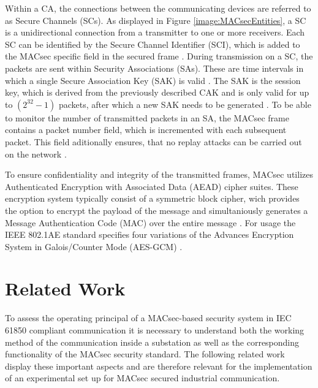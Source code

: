 \documentclass[conference, onecolumn, a4paper]{IEEEtran}
\begin{document}
\smallskip
Within a CA, the connections between the communicating devices are referred to as Secure Channels (SCs). As displayed in Figure \ref{image:MACsecEntities}, 
a SC is a unidirectional connection from a transmitter to one or more receivers. Each SC can be identified by the Secure Channel Identifier (SCI), 
which is added to the MACsec specific field in the secured frame \cite[p. 43]{IEEE-802-1AE:2018}. During transmission on a SC, the packets are sent 
within Security Associations (SAs). These are time intervals in which a single Secure Association Key (SAK) is valid \cite[p. 44]{IEEE-802-1AE:2018}. 
The SAK is the session key, which is derived from the previously described CAK and is only valid for up to ${(2^{32} -1)}$ packets, after which a new 
SAK needs to be generated \cite[p. 66]{IEEE-802-1AE:2018}. To be able to monitor the number of transmitted packets in an SA, the MACsec frame contains 
a packet number field, which is incremented with each subsequent packet. This field aditionally ensures, that no replay attacks can be carried out on 
the network \cite[p. 145]{IEEE-802-1AE:2018}. 

\smallskip
To ensure confidentiality and integrity of the transmitted frames, MACsec utilizes Authenticated Encryption with Associated Data (AEAD) cipher suites. 
These encryption system typically consist of a symmetric block cipher, wich provides the option to encrypt the payload of the message and simultaniously 
generates a Message Authentication Code (MAC) over the entire message \cite{GOOSE_confidentiality_integrity:2020}. For usage the IEEE 802.1AE standard 
specifies four variations of the Advances Encryption System in Galois/Counter Mode (AES-GCM) \cite[p. 143ff]{IEEE-802-1AE:2018}.

\section{Related Work}
\label{chapter:relatedWork}
\noindent To assess the operating principal of a MACsec-based security system in IEC 61850 compliant communication it is necessary to understand both 
the working method of the communication inside a substation as well as the corresponding functionality of the MACsec security standard. The following 
related work display these important aspects and are therefore relevant for the implementation of an experimental set up for MACsec secured industrial 
communication.
\end{document}
